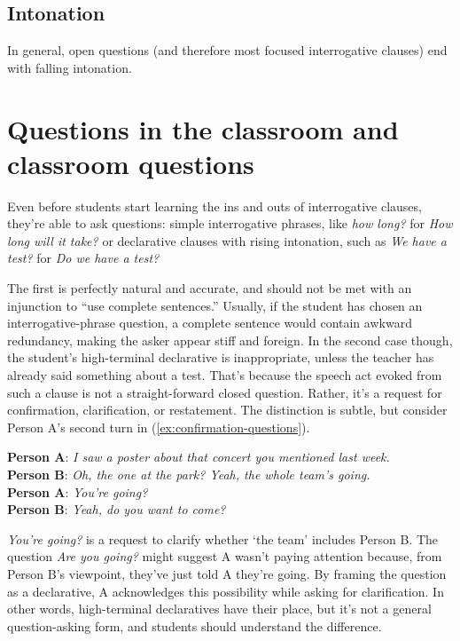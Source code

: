 \subsection{Intonation}

In general, open questions (and therefore most focused interrogative clauses) end with falling intonation.

\section{Questions in the classroom and classroom questions}

Even before students start learning the ins and outs of interrogative clauses, they're able to ask questions: simple interrogative phrases, like \textit{how long?} for \textit{How long will it take?} or declarative clauses with rising intonation, such as \textit{We have a test?} for \textit{Do we have a test?} 

The first is perfectly natural and accurate, and should not be met with an injunction to ``use complete sentences.'' Usually, if the student has chosen an interrogative-phrase question, a complete sentence would contain awkward redundancy, making the asker appear stiff and foreign. In the second case though, the student's high-terminal declarative is inappropriate, unless the teacher has already said something about a test. That's because the speech act evoked from such a clause is not a straight-forward closed question. Rather, it's a request for confirmation, clarification, or restatement. The distinction is subtle, but consider Person A's second turn in (\ref{ex:confirmation-questions}).

\ea \label{ex:confirmation-questions}
    \textbf{Person A}: \textit{I saw a poster about that concert you mentioned last week.} \\
    \textbf{Person B}: \textit{Oh, the one at the park? Yeah, the whole team's going.} \\
    \textbf{Person A}: \textit{You're going?} \\
    \textbf{Person B}: \textit{Yeah, do you want to come?} \\
\z

 \textit{You're going?} is a request to clarify whether `the team' includes Person B. The question \textit{Are you going?} might suggest A wasn't paying attention because, from Person B's viewpoint, they've just told A they're going. By framing the question as a declarative, A acknowledges this possibility while asking for clarification. In other words, high-terminal declaratives have their place, but it's not a general question-asking form, and students should understand the difference.

